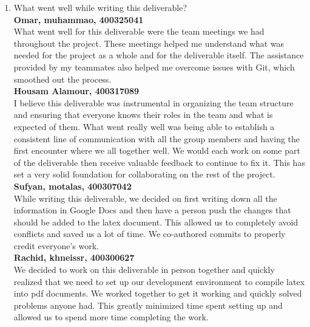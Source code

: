 \documentclass{article}
\begin{document}
\begin{enumerate}
    \item What went well while writing this deliverable? \\
    \textbf{Omar, muhammao, 400325041} \\
    What went well for this deliverable were the team meetings we had throughout the project. These meetings helped me understand what was needed for the project as a whole and for the deliverable itself. The assistance provided by my teammates also helped me overcome issues with Git, which smoothed out the process. \\

    \textbf{Housam Alamour, 400317089} \\
    I believe this deliverable was instrumental in organizing the team structure and ensuring that everyone knows their roles in the team and what is expected of them. What went really well was being able to establish a consistent line of communication with all the group members and having the first encounter where we all together well. We would each work on some part of the deliverable then receive valuable feedback to continue to fix it. This has set a very solid foundation for collaborating on the rest of the project. \\

    \textbf{Sufyan, motalas, 400307042} \\
    While writing this deliverable, we decided on first writing down all the information in Google Docs and then have a person push the changes that should be added to the latex document. This allowed us to completely avoid conflicts and saved us a lot of time. We co-authored commits to properly credit everyone's work. \\

    \textbf{Rachid, khneissr, 400300627} \\
    We decided to work on this deliverable in person together and quickly realized that we need to set up our development environment to compile latex into pdf documents. We worked together to get it working and quickly solved problems anyone had. This greatly minimized time spent setting up and allowed us to spend more time completing the work. \\


\end{enumerate}
\end{document}
